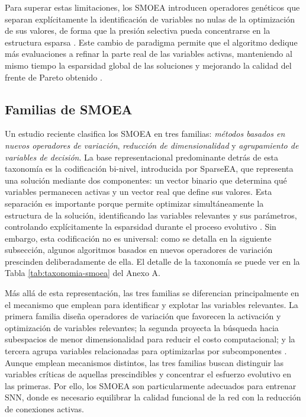 Para superar estas limitaciones, los SMOEA introducen operadores genéticos que separan explícitamente la identificación de variables no nulas de la optimización de sus valores, de forma que la presión selectiva pueda concentrarse en la estructura esparsa \cite{HUANG2025-enhanced-moea-lsmo, SparseEA2}. Este cambio de paradigma permite que el algoritmo dedique más evaluaciones a refinar la parte real de las variables activas, manteniendo al mismo tiempo la esparsidad global de las soluciones y mejorando la calidad del frente de Pareto obtenido \cite{SparseEA2, ZOU2025-sparse-LSMOEA}.


\subsection{Familias de SMOEA}
Un estudio reciente \cite{Shao2025_SMOEA} clasifica los SMOEA en tres familias: \textit{métodos basados en nuevos operadores de variación}, \textit{reducción de dimensionalidad} y \textit{agrupamiento de variables de decisión}. La base representacional predominante detrás de esta taxonomía es la codificación bi-nivel, introducida por SparseEA, que representa una solución mediante dos componentes: un vector binario que determina qué variables permanecen activas y un vector real que define sus valores. Esta separación es importante porque permite optimizar simultáneamente la estructura de la solución, identificando las variables relevantes y sus parámetros, controlando explícitamente la esparsidad durante el proceso evolutivo \cite{Tian2020AnEALSMOP, HUANG2025-enhanced-moea-lsmo}. Sin embargo, esta codificación no es universal: como se detalla en la siguiente subsección, algunos algoritmos basados en nuevos operadores de variación prescinden deliberadamente de ella. El detalle de la taxonomía se puede ver en la Tabla \ref{tab:taxonomia-smoea} del Anexo A.

Más allá de esta representación, las tres familias se diferencian principalmente en el mecanismo que emplean para identificar y explotar las variables relevantes. La primera familia diseña operadores de variación que favorecen la activación y optimización de variables relevantes; la segunda proyecta la búsqueda hacia subespacios de menor dimensionalidad para reducir el costo computacional; y la tercera agrupa variables relacionadas para optimizarlas por subcomponentes \cite{Shao2025_SMOEA, TIAN2024-lsmoea}. Aunque emplean mecanismos distintos, las tres familias buscan distinguir las variables críticas de aquellas prescindibles y concentrar el esfuerzo evolutivo en las primeras. Por ello, los SMOEA son particularmente adecuados para entrenar SNN, donde es necesario equilibrar la calidad funcional de la red con la reducción de conexiones activas.


